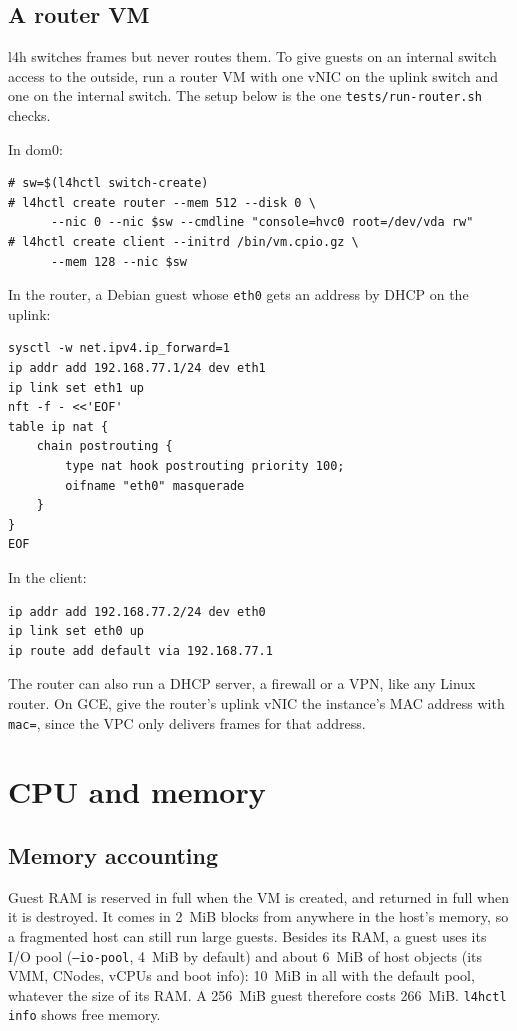 \documentclass[11pt,a4paper]{report}
\newcommand{\cmd}[1]{\texttt{#1}}
\begin{document}
\section{A router VM}
\label{sec:router}

l4h switches frames but never routes them. To give guests on an internal
switch access to the outside, run a router VM with one vNIC on the uplink
switch and one on the internal switch. The setup below is the one
\cmd{tests/run-router.sh} checks.

In dom0:
\begin{lstlisting}
# sw=$(l4hctl switch-create)
# l4hctl create router --mem 512 --disk 0 \
      --nic 0 --nic $sw --cmdline "console=hvc0 root=/dev/vda rw"
# l4hctl create client --initrd /bin/vm.cpio.gz \
      --mem 128 --nic $sw
\end{lstlisting}

In the router, a Debian guest whose \texttt{eth0} gets an address by DHCP on
the uplink:
\begin{lstlisting}
sysctl -w net.ipv4.ip_forward=1
ip addr add 192.168.77.1/24 dev eth1
ip link set eth1 up
nft -f - <<'EOF'
table ip nat {
    chain postrouting {
        type nat hook postrouting priority 100;
        oifname "eth0" masquerade
    }
}
EOF
\end{lstlisting}

In the client:
\begin{lstlisting}
ip addr add 192.168.77.2/24 dev eth0
ip link set eth0 up
ip route add default via 192.168.77.1
\end{lstlisting}
The router can also run a DHCP server, a firewall or a VPN, like any Linux
router. On GCE, give the router's uplink vNIC the instance's MAC address with
\texttt{mac=}, since the VPC only delivers frames for that address.

\chapter{CPU and memory}
\label{ch:cpu}

\section{Memory accounting}
\label{sec:memory}

Guest RAM is reserved in full when the VM is created, and returned in full
when it is destroyed. It comes in 2~MiB blocks from anywhere in the host's
memory, so a fragmented host can still run large guests. Besides its RAM,
a guest uses its I/O pool (\texttt{--io-pool}, 4~MiB by default) and about
6~MiB of host objects (its VMM, CNodes, vCPUs and boot info): 10~MiB in
all with the default pool, whatever the size of its RAM. A 256~MiB guest
therefore costs 266~MiB. \cmd{l4hctl info} shows free memory.
\end{document}
